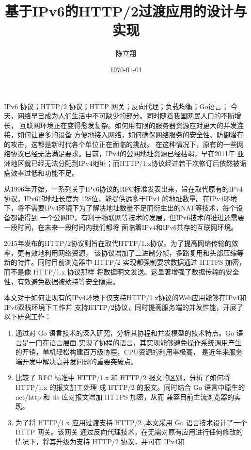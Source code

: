 \documentclass[twoside]{CUGThesis}
\title{基于IPv6的HTTP/2过渡应用的设计与实现} %
\author{陈立翔} %
\date{\today} %
\begin{document}
	\maketitle
	\makestatement
		
	\begin{cnabstract}{IPv6 协议；HTTP/2 协议；HTTP 网关；反向代理；负载均衡；Go语言； }
		今天，网络早已成为人们生活中不可缺少的部分。同时随着我国网民人口的不断增长，
	互联网环境正在变得愈发复杂。如何用有限的服务器资源应对更大的并发连接，如何让更多的设备
	方便地接入网络，如何确保网络服务的安全性、防御潜在的攻击，这都是新时代各个单位正在面临的挑战。
	在这种情况下，原有的一些网络协议已经无法满足要求。目前，IPv4的公网地址资源已经枯竭，早在2011年
	亚洲地区就已经无法分配到IPv4地址；而HTTP/1.x协议经过若干次修订后依然被诟病效率过低和功能不足。\par
		从1996年开始，一系列关于IPv6协议的RFC标准发表出来，旨在取代原有的IPv4协议。IPv6的地址长度为
	128位，能提供远多于IPv4 的地址数量。在IPv4环境下，将不需要IPv4环境下为了解决地址数量不足而衍生出的NAT等技术，每个设备都能得到
	一个公网IP，有利于物联网等技术的发展。但IPv6技术的推进还需要一段时间，在未来一段时间内我们都将
	面临着IPv4和IPv6共存的互联网环境。\par
		2015年发布的HTTP/2协议则旨在取代HTTP/1.x协议。为了提高网络传输的效率，更有效地利用网络资源，
	该协议增加了二进制分帧，多路复用和头部压缩等新的特性。同时目前浏览器中 HTTP/2 
	实现都强制要求数据通过 HTTPS 加密，而不是像 HTTP/1.x 协议那样
	将数据明文发送。这显著增强了数据传输的安全性，有效避免数据被劫持等安全隐患。\par
		本文对于如何让现有的IPv4环境下仅支持HTTP/1.x协议的Web应用能够在IPv4和IPv6双栈环境下工作并
	支持HTTP/2协议，同时提高服务端的并发性能，开展了以下研究工作：
	\begin{enumerate}
		\item 通过对 Go 语言技术的深入研究，分析其协程和并发模型的技术特点。Go 语言是一门在语言层面
		实现了协程的语言，其实现能够避免操作系统调用产生的开销，单机轻松构建百万级协程，CPU资源的利用率极高，
		是近年来服务端开发中解决高并发问题的重要突破点。
		\item 比较了 RFC 标准中 HTTP/1.x 和 HTTP/2 报文的区别，分析了如何将 HTTP/1.x 的报文加工处理
		成 HTTP/2 的报文。同时结合 Go 语言中原生的 net/http 和 tls 库对报文增加 HTTPS 加密，从而
		兼容目前主流浏览器的实现。
		\item 为了将 HTTP/1.x 应用过渡支持 HTTP/2 ,本文采用 Go 语言技术设计了一个 HTTP 网关。该网关
		通过反向代理技术，在无需对原有应用进行任何修改的情况下，将其升级为支持 HTTP/2 协议，并可在 IPv4和

\end{enumerate}
\end{cnabstract}
\end{document}
